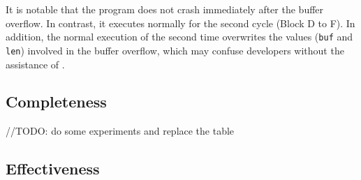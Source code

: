 It is notable that the program does not crash immediately after the buffer 
overflow. In contrast, it executes normally for the second cycle (Block D to F). 
In addition, the normal execution of the second time overwrites the 
values (\texttt{buf} and \texttt{len}) involved in the buffer overflow, which 
may confuse developers without the assistance of \TheName.


\subsection{Completeness} \label{subsec:eva-flowaccuracy}

\begin{table}
    \caption{Syscall record rate of \TheName.}
    \centering
    \label{table:Completeness}
\end{table}

//TODO: do some experiments and replace the table

\subsection{Effectiveness} \label{subsec:eva-Effectiveness}

